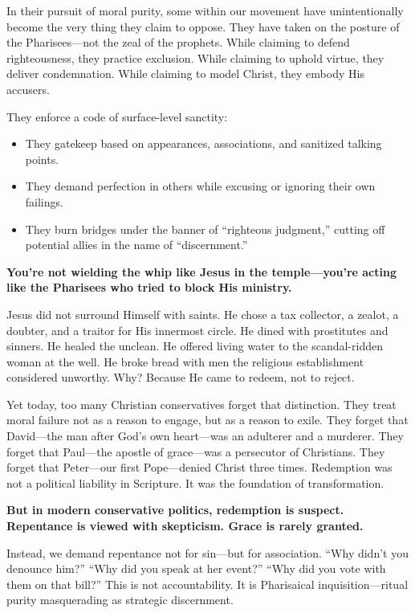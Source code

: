 In their pursuit of moral purity, some within our movement have unintentionally become the very thing they claim to oppose. They have taken on the posture of the Pharisees—not the zeal of the prophets. While claiming to defend righteousness, they practice exclusion. While claiming to uphold virtue, they deliver condemnation. While claiming to model Christ, they embody His accusers.

They enforce a code of surface-level sanctity:
\begin{itemize}
    \item They gatekeep based on appearances, associations, and sanitized talking points.
    \item They demand perfection in others while excusing or ignoring their own failings.
    \item They burn bridges under the banner of ``righteous judgment,'' cutting off potential allies in the name of ``discernment.''
\end{itemize}

\textbf{You’re not wielding the whip like Jesus in the temple—you’re acting like the Pharisees who tried to block His ministry.}

Jesus did not surround Himself with saints. He chose a tax collector, a zealot, a doubter, and a traitor for His innermost circle. He dined with prostitutes and sinners. He healed the unclean. He offered living water to the scandal-ridden woman at the well. He broke bread with men the religious establishment considered unworthy. Why? Because He came to redeem, not to reject.

Yet today, too many Christian conservatives forget that distinction. They treat moral failure not as a reason to engage, but as a reason to exile. They forget that David—the man after God’s own heart—was an adulterer and a murderer. They forget that Paul—the apostle of grace—was a persecutor of Christians. They forget that Peter—our first Pope—denied Christ three times. Redemption was not a political liability in Scripture. It was the foundation of transformation.

\textbf{But in modern conservative politics, redemption is suspect. Repentance is viewed with skepticism. Grace is rarely granted.}

Instead, we demand repentance not for sin—but for association. ``Why didn’t you denounce him?'' ``Why did you speak at her event?'' ``Why did you vote with them on that bill?'' This is not accountability. It is Pharisaical inquisition—ritual purity masquerading as strategic discernment.

